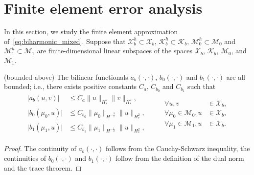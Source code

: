 \section{Finite element error analysis}\label{sec:error_analysis}

In this section, we study the finite element approximation of~\eqref{eq:biharmonic_mixed}. Suppose that $\mathcal{X}_b^h\subset{\mathcal{X}_b}$, $\mathcal{K}_b^h\subset{\mathcal{K}_b}$, $\mathcal{M}_0^h\subset{\mathcal{M}_0}$ and $\mathcal{M}_1^h\subset{\mathcal{M}_1}$ are finite-dimensional linear subspaces of the spaces $\mathcal{X}_b$, $\mathcal{K}_b$, $\mathcal{M}_0$, and $\mathcal{M}_1$.
\begin{lemma}\label{aspt:bounded-operator}
  (bounded above) The bilinear functionals $a_b(\cdot,\cdot)$, $b_0(\cdot,\cdot)$ and $b_1(\cdot,\cdot)$ are all bounded; i.e., there exists positive constants $C_a$, $C_{b_0}$ and $C_{b_1}$ such that
  \begin{align}
    \begin{split}
      \vert{a_b{(u,v)}}\vert&\leq{C_a\|u\|_{H^2_*}\|v\|_{H^2_*}},\\
      \vert{b_0{(\mu_0,u)}}\vert&\leq{C_{b_0}\|\mu_0\|_{H^{-\frac{3}{2}}}\|u\|_{H^2_*}},\\
      \vert{b_1{(\mu_1,u)}}\vert&\leq{C_{b_1}\|\mu_1\|_{H^{-\frac{1}{2}}}\|u\|_{H^2_*}},
    \end{split}
    \quad\quad
    \begin{split}
      \forall{u,v}&\in{\mathcal{X}_b},\\
      \forall{\mu_0}\in\mathcal{M}_0, {u}&\in{\mathcal{X}_b},\\
      \forall{\mu_1}\in\mathcal{M}_1, {u}&\in{\mathcal{X}_b}.
    \end{split}
  \end{align}

  \begin{proof}
    The continuity of $a_b(\cdot,\cdot)$ follows from the Cauchy-Schwarz inequality, the continuities of $b_0(\cdot,\cdot)$ and $b_1(\cdot,\cdot)$ follow from the definition of the dual norm and the trace theorem.
  \end{proof}
\end{lemma}

